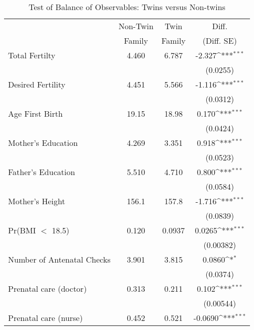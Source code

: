 \begin{table}[htbp]\centering
\def\sym#1{\ifmmode^{#1}\else\(^{#1}\)\fi}
\caption{Test of Balance of Observables: Twins versus Non-twins \label{TWINtab:comp}}
\vspace{5mm}\begin{tabular}{l*{1}{ccc}}
\toprule\toprule & Non-Twin & Twin & Diff.\\
                    &        Family&        Family&      (Diff. SE)         \\
\midrule
Total Fertilty      &       4.460&       6.787&      -2.327\sym{***}\\
                    &            &            &    (0.0255)         \\
Desired Fertility   &       4.451&       5.566&      -1.116\sym{***}\\
                    &            &            &    (0.0312)         \\
Age First Birth     &       19.15&       18.98&       0.170\sym{***}\\
                    &            &            &    (0.0424)         \\
Mother's Education  &       4.269&       3.351&       0.918\sym{***}\\
                    &            &            &    (0.0523)         \\
Father's Education  &       5.510&       4.710&       0.800\sym{***}\\
                    &            &            &    (0.0584)         \\
Mother's Height     &       156.1&       157.8&      -1.716\sym{***}\\
                    &            &            &    (0.0839)         \\
Pr(BMI $<$ 18.5)    &       0.120&      0.0937&      0.0265\sym{***}\\
                    &            &            &   (0.00382)         \\
Number of Antenatal Checks&       3.901&       3.815&      0.0860\sym{*}  \\
                    &            &            &    (0.0374)         \\
Prenatal care (doctor)&       0.313&       0.211&       0.102\sym{***}\\
                    &            &            &   (0.00544)         \\
Prenatal care (nurse)&       0.452&       0.521&     -0.0690\sym{***}\\

\end{tabular}
\end{table}
